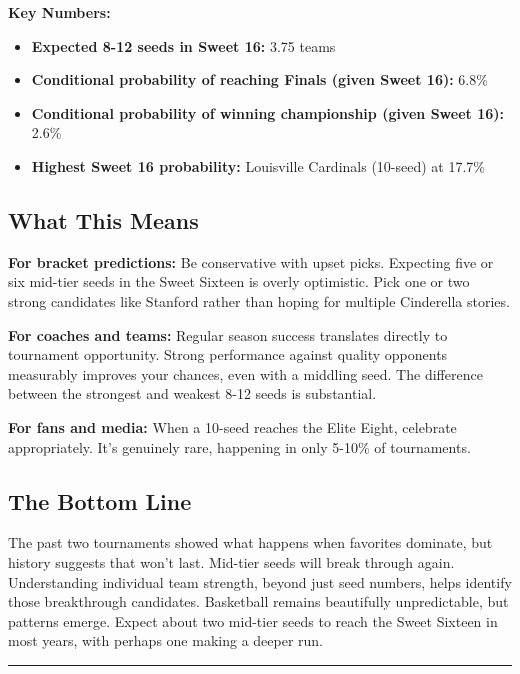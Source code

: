 \documentclass[
]{article}
\providecommand{\tightlist}{%
  \setlength{\itemsep}{0pt}\setlength{\parskip}{0pt}}
\begin{document}
\textbf{Key Numbers:}

\begin{itemize}
\tightlist
\item
  \textbf{Expected 8-12 seeds in Sweet 16:} 3.75 teams
\item
  \textbf{Conditional probability of reaching Finals (given Sweet 16):}
  6.8\%
\item
  \textbf{Conditional probability of winning championship (given Sweet
  16):} 2.6\%
\item
  \textbf{Highest Sweet 16 probability:} Louisville Cardinals (10-seed)
  at 17.7\%
\end{itemize}

\subsection{What This Means}\label{what-this-means}

\textbf{For bracket predictions:} Be conservative with upset picks.
Expecting five or six mid-tier seeds in the Sweet Sixteen is overly
optimistic. Pick one or two strong candidates like Stanford rather than
hoping for multiple Cinderella stories.

\textbf{For coaches and teams:} Regular season success translates
directly to tournament opportunity. Strong performance against quality
opponents measurably improves your chances, even with a middling seed.
The difference between the strongest and weakest 8-12 seeds is
substantial.

\textbf{For fans and media:} When a 10-seed reaches the Elite Eight,
celebrate appropriately. It's genuinely rare, happening in only 5-10\%
of tournaments.

\subsection{The Bottom Line}\label{the-bottom-line}

The past two tournaments showed what happens when favorites dominate,
but history suggests that won't last. Mid-tier seeds will break through
again. Understanding individual team strength, beyond just seed numbers,
helps identify those breakthrough candidates. Basketball remains
beautifully unpredictable, but patterns emerge. Expect about two
mid-tier seeds to reach the Sweet Sixteen in most years, with perhaps
one making a deeper run.

\begin{center}\rule{0.5\linewidth}{0.5pt}\end{center}
\end{document}
